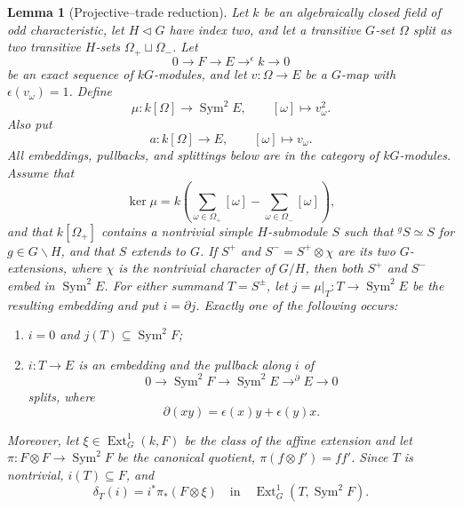 \documentclass[11pt]{article}
\newtheorem{lemma}[theorem]{Lemma}
\theoremstyle{definition}
\theoremstyle{remark}
\begin{document}
\begin{lemma}[Projective--trade reduction]
\label{lem:projective-trade-reduction}
Let \(k\) be an algebraically closed field of odd characteristic, let
\(H\triangleleft G\) have index two, and let a transitive \(G\)-set
\(\Omega\) split as two transitive \(H\)-sets
\(\Omega_+\sqcup\Omega_-\).  Let
\[
 0\longrightarrow F\longrightarrow E
  \mathrel{\mathop{\longrightarrow}^{\epsilon}}k
  \longrightarrow0
\]
be an exact sequence of \(kG\)-modules, and let
\(v:\Omega\to E\) be a \(G\)-map with
\(\epsilon(v_\omega)=1\).  Define
\[
 \mu:k[\Omega]\longrightarrow\operatorname{Sym}^2E,
 \qquad [\omega]\longmapsto v_\omega^2.
\]
Also put
\[
 a:k[\Omega]\longrightarrow E,\qquad [\omega]\longmapsto v_\omega.
\]
All embeddings, pullbacks, and splittings below are in the category of
\(kG\)-modules.
Assume that
\[
 \ker\mu
 =k\left(\sum_{\omega\in\Omega_+}[\omega]
          -\sum_{\omega\in\Omega_-}[\omega]\right),
\]
and that \(k[\Omega_+]\) contains a nontrivial simple
\(H\)-submodule \(S\) such that \({}^gS\simeq S\) for
\(g\in G\smallsetminus H\), and that \(S\) extends to \(G\).
If \(S^+\) and \(S^-=S^+\otimes\chi\) are its two
\(G\)-extensions, where \(\chi\) is the nontrivial character of \(G/H\),
then both \(S^+\) and \(S^-\) embed in
\(\operatorname{Sym}^2E\).  For either summand \(T=S^\pm\), let
\(j=\mu|_T:T\to\operatorname{Sym}^2E\) be the resulting embedding and
put \(i=\partial j\).  Exactly one of the following occurs:
\begin{enumerate}
\item \(i=0\) and \(j(T)\subseteq\operatorname{Sym}^2F\);
\item \(i:T\to E\) is an embedding and the pullback along \(i\) of
  \[
   0\longrightarrow\operatorname{Sym}^2F
   \longrightarrow\operatorname{Sym}^2E
   \mathrel{\mathop{\longrightarrow}^{\partial}}E
   \longrightarrow0
  \]
  splits, where
  \[
   \partial(xy)=\epsilon(x)y+\epsilon(y)x.
  \]
\end{enumerate}
Moreover, let \(\xi\in\operatorname{Ext}^1_G(k,F)\) be the class of
the affine extension and let
\(\pi:F\otimes F\to\operatorname{Sym}^2F\) be the canonical quotient,
\(\pi(f\otimes f')=ff'\).  Since
\(T\) is nontrivial, \(i(T)\subseteq F\), and
\[
 \delta_T(i)
 =i^*\pi_*(F\otimes\xi)
 \quad\text{in}\quad
 \operatorname{Ext}^1_G(T,\operatorname{Sym}^2F).               \tag{3.2a}
\]
\end{lemma}
\end{document}

